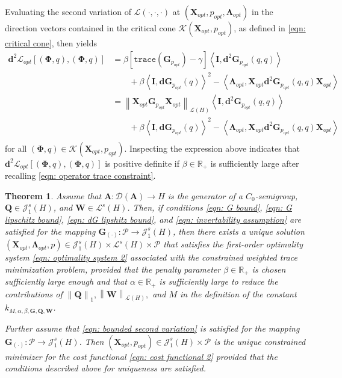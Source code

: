 \documentclass{amsart}
\newcommand{\sL}{\mathscr L}
\newcommand{\sJ}{\mathscr J}
\newcommand{\p}[1]{\left( {#1} \right)}
\newcommand{\norm}[1]{\left\| #1 \right\|}
\newcommand{\br}[1]{\left[ #1 \right]}
\newcommand{\dual}[1]{\left< #1 \right>}
\newcommand{\trace}[1]{\texttt{trace}\left( #1\right)}
\newcommand{\sP}{\mathcal{P}}
\newcommand{\bA}{\mathbf A}
\newcommand{\bX}{\mathbf X}
\newcommand{\bQ}{\mathbf Q}
\newcommand{\bG}{\mathbf G}
\newcommand{\bPhi}{\boldsymbol{\Phi}}
\newcommand{\bLambda}{\boldsymbol{\Lambda}}
\newcommand{\bd}{\mathbf d}
\newcommand{\bW}{\mathbf W}
\newtheorem{theorem}{Theorem}
\begin{document}
Evaluating the second variation of $\mathcal L(\cdot,\cdot,\cdot)$ at $(\bX_{opt}, p_{opt}, \bLambda_{opt})$ in the direction vectors contained in the critical cone $\mathcal K(\bX_{opt}, p_{opt})$, as defined in \eqref{eqn: critical cone}, then yields 
$$
\begin{aligned}
    \bd^2\mathcal L_{opt}[(\bPhi, q), (\bPhi, q)] &= 
    \beta\br{\trace{\bG_{p_{opt}}} - \gamma}\dual{\mathbf I, \bd^2\bG_{p_{opt}}(q,q)}\\
    &\qquad+ \beta\dual{\mathbf I, \bd\bG_{p_{opt}}(q)}^2
    - \dual{\bLambda_{opt},\bX_{opt}\bd^2\bG_{p_{opt}}(q,q)\bX_{opt}} \\
    &= \norm{\bX_{opt}\bG_{p_{opt}} \bX_{opt}}_{\sL\p{H}}\dual{\mathbf I, \bd^2\bG_{p_{opt}}(q,q)}\\
    &\qquad+ \beta\dual{\mathbf I, \bd\bG_{p_{opt}}(q)}^2
    - \dual{\bLambda_{opt},\bX_{opt}\bd^2\bG_{p_{opt}}(q,q)\bX_{opt}} \\
\end{aligned}
$$
for all $\p{\bPhi, q} \in \mathcal K\p{\bX_{opt}, p_{opt}}.$ Inspecting the expression above indicates that $\bd^2\mathcal L_{opt}[(\bPhi, q), (\bPhi, q)]$ is positive definite if $\beta \in \mathbb R_+$ is sufficiently large after recalling \eqref{eqn: operator trace constraint}. 

\begin{theorem} \label{theorem: well-posedness optimization 2}
Assume that $\bA: \mathcal D(\bA) \rightarrow H$ is the generator of a $C_0$-semigroup, $\bQ \in \sJ_1^s(H)$, and $\bW \in \sL^s(H)$. Then, if conditions \eqref{eqn: G bound}, \eqref{eqn: G lipschitz bound}, \eqref{eqn: dG lipshitz bound}, and \eqref{eqn: invertability assumption} are satisfied for the mapping $\bG_{(\cdot)}: \sP \rightarrow \sJ_1^s(H)$, then there exists a unique solution $\p{\bX_{opt}, \bLambda_{opt}, p} \in \sJ_1^s(H) \times \sL^s\p{H} \times \sP$ that satisfies the first-order optimality system \eqref{eqn: optimality system 2} associated with the constrained weighted trace minimization problem, provided that the penalty parameter $\beta\in\mathbb R_+$ is chosen sufficiently large enough and that $\alpha \in \mathbb R_+$ is sufficiently large to reduce the contributions of $\norm{\bQ}_1, \norm{\bW}_{\sL(H)},$ and $M$ in the definition of the constant $k_{M, \alpha, \beta, \bG, \bQ, \bW}$. 


Further assume that \eqref{eqn: bounded second variation} is satisfied for the mapping $\bG_{(\cdot)}: \sP \rightarrow \sJ_1^s(H)$. Then $\p{\bX_{opt}, p_{opt}} \in \sJ_1^s(H)\times \sP$ is the unique constrained minimizer for the cost functional \eqref{eqn: cost functional 2} provided that the conditions described above for uniqueness are satisfied. 
\end{theorem}
\end{document}
